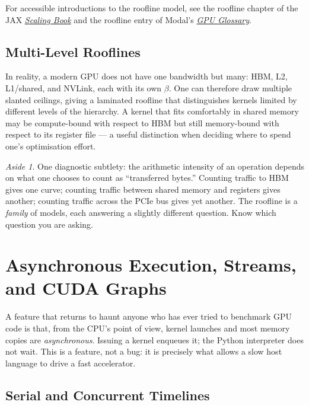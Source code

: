\documentclass[11pt,a4paper]{article}
\theoremstyle{definition}
\theoremstyle{remark}
\newtheorem*{aside}{Aside}
\theoremstyle{plain}
\begin{document}
For accessible introductions to the roofline model, see the roofline
chapter of the JAX
\href{https://jax-ml.github.io/scaling-book/roofline}{\textit{Scaling
Book}} and the roofline entry of Modal's
\href{https://modal.com/gpu-glossary/perf/roofline-model}{\textit{GPU
Glossary}}.

\subsection{Multi-Level Rooflines}

In reality, a modern GPU does not have one bandwidth but many: HBM,
L2, L1/shared, and NVLink, each with its own $\beta$. One can
therefore draw multiple slanted ceilings, giving a laminated
roofline that distinguishes kernels limited by different levels of
the hierarchy. A kernel that fits comfortably in shared memory may
be compute-bound with respect to HBM but still memory-bound with
respect to its register file --- a useful distinction when deciding
where to spend one's optimisation effort.

\begin{aside}
One diagnostic subtlety: the arithmetic intensity of an operation
depends on what one chooses to count as ``transferred bytes.''
Counting traffic to HBM gives one curve; counting traffic between
shared memory and registers gives another; counting traffic across
the PCIe bus gives yet another. The roofline is a \emph{family} of
models, each answering a slightly different question. Know which
question you are asking.
\end{aside}

\section{Asynchronous Execution, Streams, and CUDA Graphs}

A feature that returns to haunt anyone who has ever tried to
benchmark GPU code is that, from the CPU's point of view, kernel
launches and most memory copies are \emph{asynchronous}. Issuing a
kernel enqueues it; the Python interpreter does not wait. This is a
feature, not a bug: it is precisely what allows a slow host language
to drive a fast accelerator.

\subsection{Serial and Concurrent Timelines}
\end{document}
